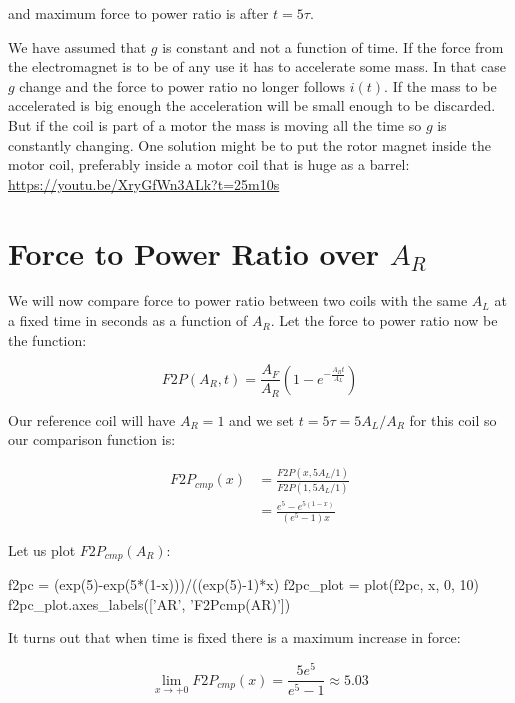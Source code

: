\documentclass[]{elementary-physics}
\begin{document}
and maximum force to power ratio is after $t = 5 \tau$.

We have assumed that $g$ is constant and not a function of time.
If the force from the electromagnet is to be of any use it has to accelerate some mass.
In that case $g$ change and the force to power ratio no longer follows $i(t)$.
If the mass to be accelerated is big enough the acceleration will be small enough to be discarded.
But if the coil is part of a motor the mass is moving all the time so $g$ is constantly changing.
One solution might be to put the rotor magnet inside the motor coil, preferably inside a motor coil that is huge as a barrel\cite{jonew}: \url{https://youtu.be/XryGfWn3ALk?t=25m10s}

\section{Force to Power Ratio over $A_R$}

We will now compare force to power ratio between two coils with the same $A_L$ at a fixed time in seconds as a function of $A_R$. Let the force to power ratio now be the function:

\begin{equation}
F2P(A_R,t) = \frac{A_F}{A_R} (1 - e^{- \frac{A_R t}{A_L}})
\end{equation}

Our reference coil will have $A_R = 1$ and we set $t = 5 \tau = 5 A_L/A_R$ for this coil so our comparison function is:

\begin{subequations}
\begin{align}
F2P_{cmp}(x) &= \frac{F2P(x,5 A_L/1)}{F2P(1,5 A_L/1)} \\
&= \frac{e^5-e^{5(1-x)}}{(e^5-1)x}
\end{align}
\end{subequations}

Let us plot $F2P_{cmp}(A_R)$:

\begin{sagesilent}
f2pc = (exp(5)-exp(5*(1-x)))/((exp(5)-1)*x)
f2pc_plot = plot(f2pc, x, 0, 10)
f2pc_plot.axes_labels(['AR', 'F2Pcmp(AR)'])
\end{sagesilent}


It turns out that when time is fixed there is a maximum increase in force:

\begin{equation}
\lim_{x \to +0} F2P_{cmp}(x) = \frac{5 e^5}{e^5-1} \approx 5.03
\end{equation}
\end{document}

